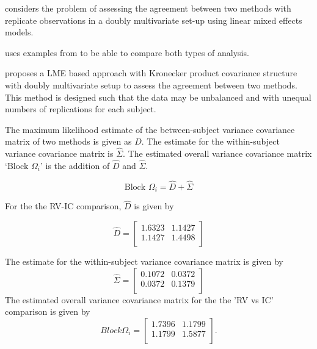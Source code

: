 \documentclass[12pt, a4paper]{report}
\theoremstyle{plain}
\theoremstyle{definition}
\theoremstyle{remark}
\begin{document}
\citet{ARoy2009} considers the problem of assessing the agreement
between two methods with replicate observations in a doubly
multivariate set-up using linear mixed effects models.

\citet{ARoy2009} uses examples from \citet{BA86} to be able to
compare both types of analysis.

\citet{ARoy2009} proposes a LME based approach with Kronecker
product covariance structure with doubly multivariate setup to
assess the agreement between two methods. This method is designed
such that the data may be unbalanced and with unequal numbers of
replications for each subject.

The maximum likelihood estimate of the between-subject variance
covariance matrix of two methods is given as $D$. The estimate for
the within-subject variance covariance matrix is $\hat{\Sigma}$.
The estimated overall variance covariance matrix `Block
$\Omega_{i}$' is the addition of $\hat{D}$ and $\hat{\Sigma}$.


\begin{equation}
\mbox{Block  }\Omega_{i} = \hat{D} + \hat{\Sigma}
\end{equation}

For the the RV-IC comparison, $\hat{D}$ is given by


\begin{equation}
\hat{D}= \left[ \begin{array}{cc}
1.6323 & 1.1427  \\
1.1427 & 1.4498 \\
\end{array} \right]
\end{equation}

The estimate for the within-subject variance covariance matrix is
given by
\begin{equation}
\hat{\Sigma}= \left[ \begin{array}{cc}
0.1072 & 0.0372  \\
0.0372 & 0.1379  \\
\end{array}\right]
\end{equation}
The estimated overall variance covariance matrix for the the 'RV
vs IC' comparison is given by
\begin{equation}
Block \Omega_{i}= \left[ \begin{array}{cc}
1.7396 & 1.1799  \\
1.1799 & 1.5877  \\
\end{array} \right].
\end{equation}
\end{document}
